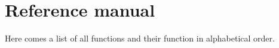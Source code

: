 
\part{Reference manual}
\label{part:3}

Here comes a list of all functions and their function in alphabetical order.

